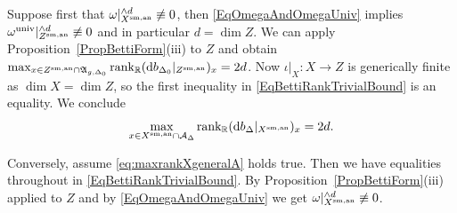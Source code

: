 Suppose first that $\omega|_{{X}^{\mathrm{sm,an}}}^{\wedge d}\not\equiv 0$, then
\eqref{EqOmegaAndOmegaUniv} implies
$\omega^{\mathrm{univ}}|_{{Z}^{\mathrm{sm,an}}}^{\wedge d}\not\equiv 0$ and in
particular $d=\dim Z$. 
We can apply 
Proposition~\ref{PropBettiForm}(iii)  to $Z$ and obtain
$ \max_{x \in {Z}^{\mathrm{sm,an}} \cap \mathfrak{A}_{g,\Delta_0}} \mathrm{rank}_{{\mathbb{R}}}
(\mathrm{d}b_{\Delta_0}|_{Z^{\mathrm{sm,an}}})_x =2d$. 
Now $\iota|_X\colon X\rightarrow Z$ is
generically finite as $\dim X = \dim Z$,
so the first inequality in \eqref{EqBettiRankTrivialBound} is an
equality. We conclude
\begin{equation}
\label{eq:maxrankXgeneralA}
\max_{x \in {X}^{\mathrm{sm,an}} \cap \mathcal{A}_\Delta} \mathrm{rank}_{{\mathbb{R}}}
(\mathrm{d}b_{\Delta}|_{X^{\mathrm{sm,an}}})_x =2d.
\end{equation}


Conversely, assume \eqref{eq:maxrankXgeneralA} holds true.
Then we have equalities throughout in \eqref{EqBettiRankTrivialBound}.
By Proposition~\ref{PropBettiForm}(iii) applied to $Z$ and
by \eqref{EqOmegaAndOmegaUniv} we get $\omega|_{{X}^{\mathrm{sm,an}}}^{\wedge
d}\not\equiv 0$. 




